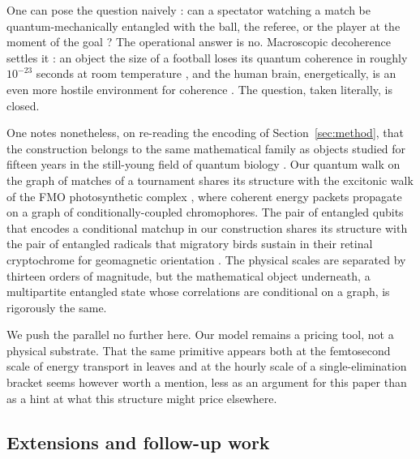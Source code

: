 \documentclass[11pt]{article}
\begin{document}
One can pose the question naively : can a spectator watching a match
be quantum-mechanically entangled with the ball, the referee, or the
player at the moment of the goal ? The operational answer is no.
Macroscopic decoherence settles it : an object the size of a
football loses its quantum coherence in roughly $10^{-23}$ seconds
at room temperature \cite{joos_zeh_1985}, and the human brain,
energetically, is an even more hostile environment for coherence
\cite{tegmark_2000}. The question, taken literally, is closed.

One notes nonetheless, on re-reading the encoding of
Section~\ref{sec:method}, that the construction belongs to the same
mathematical family as objects studied for fifteen years in the
still-young field of quantum biology \cite{lambert2013quantum}. Our
quantum walk on the graph of matches of a tournament shares its
structure with the excitonic walk of the FMO photosynthetic complex
\cite{engel_2007, plenio2008dephasing}, where coherent energy packets
propagate on a graph of conditionally-coupled chromophores. The pair of entangled qubits
that encodes a conditional matchup in our construction shares its
structure with the pair of entangled radicals that migratory birds
sustain in their retinal cryptochrome for geomagnetic orientation
\cite{hore_mouritsen_2016}. The physical scales are separated by
thirteen orders of magnitude, but the mathematical object underneath,
a multipartite entangled state whose correlations are conditional
on a graph, is rigorously the same.

We push the parallel no further here. Our model remains a pricing
tool, not a physical substrate. That the same primitive appears
both at the femtosecond scale of energy transport in leaves and at
the hourly scale of a single-elimination bracket seems however
worth a mention, less as an argument for this paper than as a hint
at what this structure might price elsewhere.

\subsection{Extensions and follow-up work}
\end{document}
